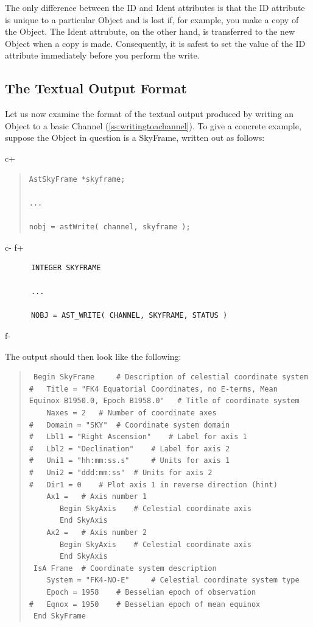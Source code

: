 \documentclass[twoside,11pt]{article}
\newcommand{\secref}[1]{\S\ref{#1}}
\renewcommand{\secref}[1]{\ref{#1}}
\begin{document}
The only difference between the ID and Ident attributes is that the ID
attribute is unique to a particular Object and is lost if, for example,
you make a copy of the Object. The Ident attrubute, on the other hand, is
transferred to the new Object when a copy is made. Consequently, it is
safest to set the value of the ID attribute immediately before you
perform the write.

\subsection{\label{ss:textualoutputformat}The Textual Output Format} 

Let us now examine the format of the textual output produced by
writing an Object to a basic Channel
(\secref{ss:writingtoachannel}). To give a concrete example, suppose
the Object in question is a SkyFrame, written out as follows:

c+
\begin{quote}
\small
\begin{verbatim}
AstSkyFrame *skyframe;

...

nobj = astWrite( channel, skyframe );
\end{verbatim}
\normalsize
\end{quote}
c-
f+
\small
\begin{verbatim}
      INTEGER SKYFRAME

      ...

      NOBJ = AST_WRITE( CHANNEL, SKYFRAME, STATUS )
\end{verbatim}
\normalsize
f-

The output should then look like the following:

\begin{quote}
\small
\begin{verbatim}
 Begin SkyFrame 	# Description of celestial coordinate system
#   Title = "FK4 Equatorial Coordinates, no E-terms, Mean Equinox B1950.0, Epoch B1958.0" 	# Title of coordinate system
    Naxes = 2 	# Number of coordinate axes
#   Domain = "SKY" 	# Coordinate system domain
#   Lbl1 = "Right Ascension" 	# Label for axis 1
#   Lbl2 = "Declination" 	# Label for axis 2
#   Uni1 = "hh:mm:ss.s" 	# Units for axis 1
#   Uni2 = "ddd:mm:ss" 	# Units for axis 2
#   Dir1 = 0 	# Plot axis 1 in reverse direction (hint)
    Ax1 = 	# Axis number 1
       Begin SkyAxis 	# Celestial coordinate axis
       End SkyAxis
    Ax2 = 	# Axis number 2
       Begin SkyAxis 	# Celestial coordinate axis
       End SkyAxis
 IsA Frame 	# Coordinate system description
    System = "FK4-NO-E" 	# Celestial coordinate system type
    Epoch = 1958 	# Besselian epoch of observation
#   Eqnox = 1950 	# Besselian epoch of mean equinox
 End SkyFrame
\end{verbatim}
\normalsize
\end{quote}
\end{document}
